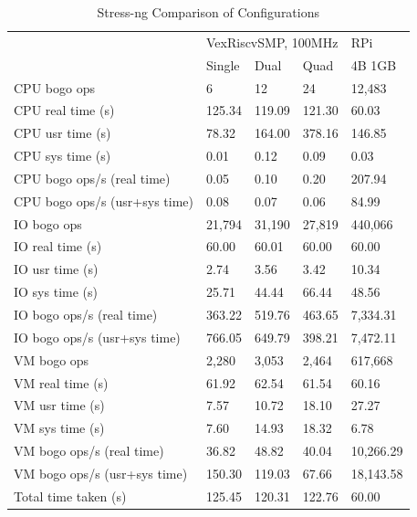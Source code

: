 \begin{table}[ht]
    \centering
    \caption{Stress-ng Comparison of Configurations}
    \begin{tabular}{lllll}
                                  & \multicolumn{3}{l}{VexRiscvSMP, 100MHz} & RPi       \\ \cline{2-5} 
                                  & Single      & Dual        & Quad        & 4B 1GB    \\ \hline
    CPU bogo ops                  & 6           & 12          & 24          & 12,483    \\ \hline
    CPU real time (s)             & 125.34      & 119.09      & 121.30      & 60.03     \\
    CPU usr time (s)              & 78.32       & 164.00      & 378.16      & 146.85    \\
    CPU sys time (s)              & 0.01        & 0.12        & 0.09        & 0.03      \\
    CPU bogo ops/s (real time)    & 0.05        & 0.10        & 0.20        & 207.94    \\
    CPU bogo ops/s (usr+sys time) & 0.08        & 0.07        & 0.06        & 84.99     \\ \hline
    IO bogo ops                   & 21,794      & 31,190      & 27,819      & 440,066   \\ \hline
    IO real time (s)              & 60.00       & 60.01       & 60.00       & 60.00     \\
    IO usr time (s)               & 2.74        & 3.56        & 3.42        & 10.34     \\
    IO sys time (s)               & 25.71       & 44.44       & 66.44       & 48.56     \\
    IO bogo ops/s (real time)     & 363.22      & 519.76      & 463.65      & 7,334.31  \\
    IO bogo ops/s (usr+sys time)  & 766.05      & 649.79      & 398.21      & 7,472.11  \\ \hline
    VM bogo ops                   & 2,280       & 3,053       & 2,464       & 617,668   \\ \hline
    VM real time (s)              & 61.92       & 62.54       & 61.54       & 60.16     \\
    VM usr time (s)               & 7.57        & 10.72       & 18.10       & 27.27     \\
    VM sys time (s)               & 7.60        & 14.93       & 18.32       & 6.78      \\
    VM bogo ops/s (real time)     & 36.82       & 48.82       & 40.04       & 10,266.29 \\
    VM bogo ops/s (usr+sys time)  & 150.30      & 119.03      & 67.66       & 18,143.58 \\ \hline
    Total time taken (s)          & 125.45      & 120.31      & 122.76      & 60.00     \\ \hline
    \end{tabular}
    \label{table:stress1}
\end{table}
\raggedbottom

